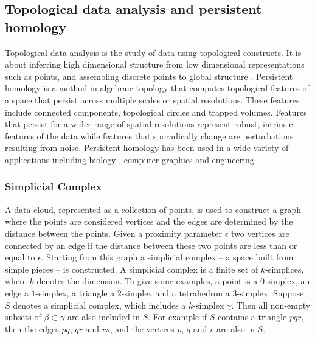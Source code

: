 \documentclass[letter,12pt]{article}
\begin{document}
\subsection{Topological data analysis and persistent homology}\label{subsec:tda}
Topological data analysis is the study of data using topological constructs. It is about inferring high dimensional structure from low dimensional representations such as points, and assembling discrete points to global structure \citep{ghrist2008barcodes}. Persistent homology is a method in algebraic topology that computes topological features of a space that persist across multiple scales or spatial resolutions. These features include connected components, topological circles and trapped volumes.  Features that persist for a wider range of spatial resolutions represent robust, intrinsic features of the data while features that sporadically change are perturbations resulting from noise. Persistent homology has been used in a wide variety of applications including biology  \citep{topaz2015topological}, computer graphics \citep{carlsson2008local} and engineering \citep{perea2015sliding}.

\subsubsection{Simplicial Complex}\label{subsubsec:simplicialcomplex}
A data cloud, represented as a collection of points, is used to construct a graph where the points are considered vertices and the edges are determined by the distance between the points. Given a proximity parameter $\epsilon$ two vertices are connected by an edge if the distance between these two points are less than or equal to $\epsilon$. Starting from this graph a simplicial complex -- a space built from simple pieces -- is constructed. A simplicial complex is a finite set of $k$-simplices, where $k$ denotes the dimension. To give some examples, a point is a $0$-simplex, an edge a $1$-simplex, a triangle a $2$-simplex and a tetrahedron a $3$-simplex. Suppose $S$ denotes a simplicial complex, which includes a $k$-simplex $\gamma$. Then all non-empty subsets of $\beta \subset \gamma$ are also included in $S$. For example if $S$ contains a triangle $pqr$, then the edges $pq$, $qr$ and $rs$, and the vertices $p$, $q$ and $r$ are also in $S$. 
\end{document}
